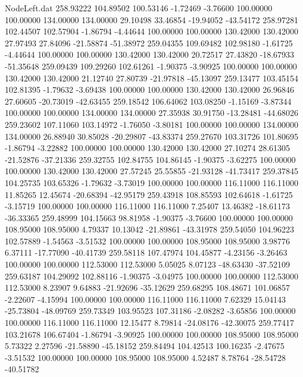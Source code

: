 \begin{filecontents}{NodeLeft.dat}
 258.93222  104.89502  100.53146    -1.72469   -3.76600  100.00000  100.00000  134.00000  134.00000   29.10498   33.46854  -19.94052  -43.54172
 258.97281  102.44507  102.57904    -1.86794   -4.44644  100.00000  100.00000  130.42000  130.42000   27.97493   27.84096  -21.58874  -51.38972
 259.04355  109.69482  102.98180    -1.61725   -4.44644  100.00000  100.00000  130.42000  130.42000   20.72517   27.43820  -18.67933  -51.35648
 259.09439  109.29260  102.61261    -1.90375   -3.90925  100.00000  100.00000  130.42000  130.42000   21.12740   27.80739  -21.97818  -45.13097
 259.13477  103.45154  102.81395    -1.79632   -3.69438  100.00000  100.00000  130.42000  130.42000   26.96846   27.60605  -20.73019  -42.63455
 259.18542  106.64062  103.08250    -1.15169   -3.87344  100.00000  100.00000  134.00000  134.00000   27.35938   30.91750  -13.28481  -44.68026
 259.23602  107.11060  103.14972    -1.76050   -3.80181  100.00000  100.00000  134.00000  134.00000   26.88940   30.85028  -20.29807  -43.83374
 259.27670  103.31726  101.80695    -1.86794   -3.22882  100.00000  100.00000  130.42000  130.42000   27.10274   28.61305  -21.52876  -37.21336
 259.32755  102.84755  104.86145    -1.90375   -3.62275  100.00000  100.00000  130.42000  130.42000   27.57245   25.55855  -21.93128  -41.73417
 259.37845  104.25735  103.65326    -1.79632   -3.73019  100.00000  100.00000  116.11000  116.11000   11.85265   12.45674  -20.68394  -42.95179
 259.43918  108.85593  102.64618    -1.61725   -3.15719  100.00000  100.00000  116.11000  116.11000    7.25407   13.46382  -18.61173  -36.33365
 259.48999  104.15663   98.81958    -1.90375   -3.76600  100.00000  100.00000  108.95000  108.95000    4.79337   10.13042  -21.89861  -43.31978
 259.54050  104.96223  102.57889    -1.54563   -3.51532  100.00000  100.00000  108.95000  108.95000    3.98776    6.37111  -17.77090  -40.41739
 259.58118  107.47974  104.45877    -4.23156   -3.26463  100.00000  100.00000  112.53000  112.53000    5.05025    8.07123  -48.63430  -37.52109
 259.63187  104.29092  102.88116    -1.90375   -3.04975  100.00000  100.00000  112.53000  112.53000    8.23907    9.64883  -21.92696  -35.12629
 259.68295  108.48671  101.06857    -2.22607   -4.15994  100.00000  100.00000  116.11000  116.11000    7.62329   15.04143  -25.73804  -48.09769
 259.73349  103.95523  107.31186    -2.08282   -3.65856  100.00000  100.00000  116.11000  116.11000   12.15477    8.79814  -24.08176  -42.30075
 259.77417  103.21678  106.67404    -1.86794   -3.90925  100.00000  100.00000  108.95000  108.95000    5.73322    2.27596  -21.58890  -45.18152
 259.84494  104.42513  100.16235    -2.47675   -3.51532  100.00000  100.00000  108.95000  108.95000    4.52487    8.78764  -28.54728  -40.51782

\end{filecontents}
